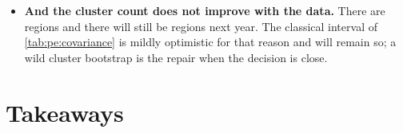 \begin{itemize}[leftmargin=*]
        \cref{sec:pe:bayes} refits under $\text{HalfNormal}(0.1)$ and $\text{HalfNormal}(2)$ and the
        posterior $\tau_\beta$ moves only from \nbThreeTauTight{} to \nbThreeTauLoose{} while the
        priced roster is \nbThreeTauVerdict. That is a fact about \nbThreeNObs{} region-weeks, not a
        law. Inspect $\tau_\beta$'s posterior (here \nbThreeTauBeta, comfortably away from zero) and
        sweep its prior --- the one modelling choice in this chapter that could rewrite a price list
        without leaving a diagnostic behind.
  \item \textbf{And the cluster count does not improve with the data.} There are
        \nbThreeNClusters{} regions and there will still be \nbThreeNClusters{} regions next year.
        The classical interval of \cref{tab:pe:covariance} is mildly optimistic for that reason and
        will remain so; a wild cluster bootstrap \citep{cameron2008} is the repair when the decision
        is close.
\end{itemize}

\section{Takeaways}
\label{sec:pe:take}

